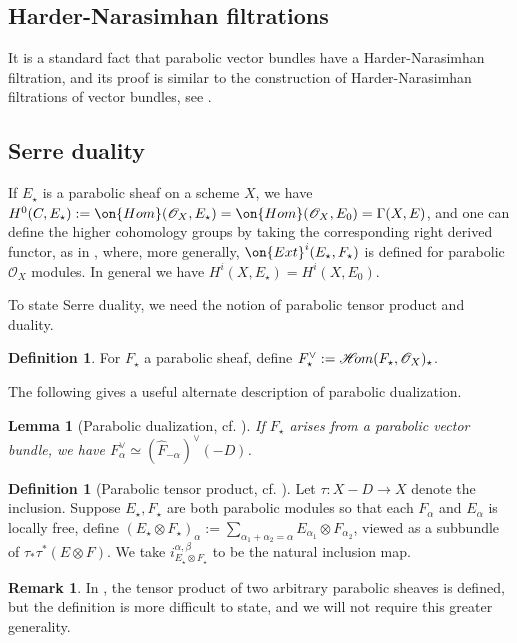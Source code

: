 \documentclass[12 pt]{amsart}
\theoremstyle{plain}
\newtheorem{lemma}[subsubsection]{Lemma}
\theoremstyle{definition}
\newtheorem{definition}[subsubsection]{Definition}
\newtheorem{remark}[subsubsection]{Remark}
\theoremstyle{remark}
\numberwithin{equation}{section}
\newcommand*{\sheafhom}{\mathscr{H}\kern -2pt om}
\begin{document}
\subsection{Harder-Narasimhan filtrations}
\label{subsubsection:harder-narasimhan-parabolic}
It is a standard fact that parabolic vector bundles have a Harder-Narasimhan
filtration, and its proof is similar to the construction of Harder-Narasimhan
filtrations of vector bundles, see 
\cite[Part 3, \S1.B, Theorem 8]{seshadri:fibres-vectoriels-sur-les-courbes-algebriques}.
	
\subsection{Serre duality}

If $E_\star$ is a parabolic sheaf on a scheme
$X$, we have $H^0(C, E_\star) := \on{Hom}(\mathscr O_X, E_\star) =
\on{Hom}(\mathscr O_X, E_0) = \Gamma(X, E)$, and one can define the
higher cohomology groups by taking the corresponding right derived functor, as in 
\cite[p. 130]{yokogawa:infinitesimal-deformation}, where, more generally,
$\on{Ext}^i(E_\star, F_\star)$ is defined for parabolic $\mathscr O_X$ modules.
In general we have $H^i(X, E_\star)=H^i(X, E_0)$.

To state Serre duality, we need the notion of parabolic tensor product and
duality.
\begin{definition}
	\label{definition:dualization}
	For $F_\star$ a parabolic sheaf, define $F^\vee_\star :=
	\sheafhom(F_\star, \mathscr O_X)_\star$.
\end{definition}
The following gives a useful alternate description of parabolic dualization.
\begin{lemma}[Parabolic dualization, cf. ]
	\label{lemma:parabolic-dual-formula}
	If $F_\star$ arises from a parabolic vector bundle, we have
	$F^\vee_\alpha \simeq (\widehat{F}_{-\alpha})^\vee (-D)$.
\end{lemma}

\begin{definition}[Parabolic tensor product, cf. ]
	\label{definition:parabolic-tensor}
	Let $\tau: X - D \to X$ denote the inclusion.
	Suppose $E_\star, F_\star$ are both parabolic modules so that each $F_\alpha$
	and $E_\alpha$ is locally free,
	define $(E_\star \otimes F_\star)_\alpha := \sum_{\alpha_1 + \alpha_2 =
	\alpha} E_{\alpha_1} \otimes F_{\alpha_2}$, viewed as a subbundle of
	$\tau_* \tau^*(E \otimes F)$. We take $i^{\alpha,\beta}_{E_\star \otimes F_\star}$ to be the natural inclusion map.
\end{definition}
\begin{remark}
	\label{remark:}
	In \cite[p. 136-137]{yokogawa:infinitesimal-deformation}, the tensor
	product of two arbitrary parabolic sheaves is defined, but the
	definition is more difficult to state, and we will not require this
	greater generality.
\end{remark}
\end{document}
